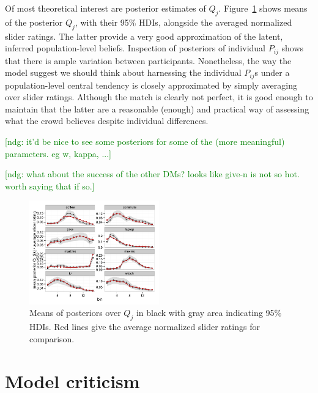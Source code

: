 \documentclass[10pt,letterpaper]{article}
\newcommand{\ndg}[1]{\textcolor{Green}{[ndg: #1]}}
\begin{document}
Of most theoretical interest are posterior estimates of $Q_j$. Figure~\ref{fig:PosteriorQj}
shows means of the posterior $Q_j$, with their 95\% HDIs, alongside the averaged normalized
slider ratings. The latter provide a very good approximation of the latent, inferred
population-level beliefs. Inspection of posteriors of individual $P_{ij}$ shows that there is
ample variation between participants. Nonetheless, the way the model suggest we should think about
harnessing the individual $P_{ij}$s under a population-level central tendency is closely
approximated by simply averaging over slider ratings. Although the match is clearly not
perfect, it is good enough to maintain that the latter are a reasonable (enough) and practical
way of assessing what the crowd believes despite individual differences.

\ndg{it'd be nice to see some posteriors for some of the (more meaningful) parameters. eg w, kappa, ...}

\ndg{what about the success of the other DMs? looks like give-n is not so hot. worth saying that if so.}

\begin{figure}
  \centering
  \includegraphics[width = 0.5\textwidth]{plots/pop_priors.pdf}
  \caption{Means of posteriors over $Q_j$ in black with gray area indicating 95\% HDIs. Red
    lines give the average normalized slider ratings for comparison.}
  \label{fig:PosteriorQj}
\end{figure}

\section{Model criticism}
\end{document}
